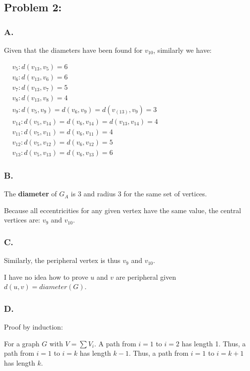 \documentclass[12pt,letterpaper]{article}
\begin{document}
\subsection*{Problem 2:}
\subsubsection*{A.}
Given that the diameters have been found for $v_{10}$, similarly we have:

\begin{flushleft}
$\begin{aligned}
    & v_5: d(v_{13}, v_5)=6\\
    & v_6: d(v_{13}, v_6)=6\\
    & v_7: d(v_{13}, v_7)=5\\
    & v_8: d(v_{13}, v_8)=4\\
    & v_9: d(v_5, v_9) = d(v_6, v_9) = d(v_(13), v_9)=3\\
    & v_{14}: d(v_5, v_{14}) = d(v_6, v_{14}) = d(v_{13}, v_{14})=4\\
    & v_{11}: d(v_5, v_{11}) = d(v_6, v_{11})=4\\
    & v_{12}: d(v_5, v_{12}) = d(v_6, v_{12})=5\\
    & v_{13}: d(v_5, v_{13}) = d(v_6, v_{13})=6
\end{aligned}$
\end{flushleft}

\subsubsection*{B.}
The \textbf{diameter} of $G_A$ is 3 and radius 3 for the same set of vertices.

Because all eccentricities for any given vertex have the same value, the
central vertices are: $v_9$ and $v_{10}$.

\subsubsection*{C.}
Similarly, the peripheral vertex is thus $v_9$ and $v_{10}$.

I have no idea how to prove $u$ and $v$ are peripheral given $d(u, v) =
diameter(G)$.

\subsubsection*{D.}
Proof by induction:

For a graph $G$ with $V={\sum V_i}$. A path from $i=1$ to $i=2$ has length 1.
Thus, a path from $i=1$ to $i=k$ has length $k-1$.
Thus, a path from $i=1$ to $i=k+1$ has length $k$.
\end{document}
